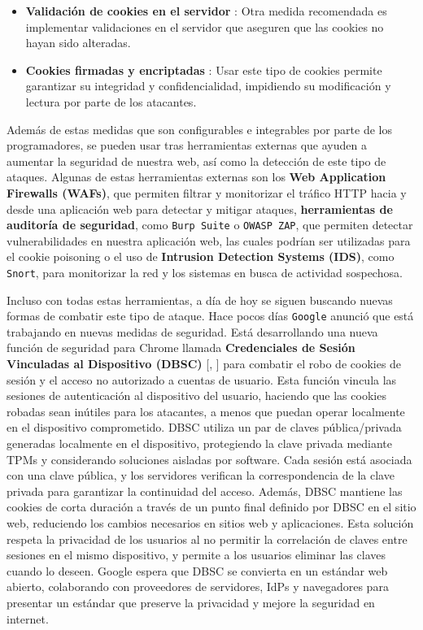 \begin{itemize}
    \item \textbf{Validación de cookies en el servidor} : Otra medida recomendada es implementar validaciones en el servidor que aseguren que las cookies no hayan sido alteradas.

    \item \textbf{Cookies firmadas y encriptadas} : Usar este tipo de cookies permite garantizar su integridad y confidencialidad, impidiendo su modificación y lectura por parte de los atacantes.
\end{itemize}

Además de estas medidas que son configurables e integrables por parte de los programadores, se pueden usar tras herramientas externas que ayuden a aumentar la seguridad de nuestra web, así como la detección de este tipo de ataques. Algunas de estas herramientas externas son los \textbf{Web Application Firewalls (WAFs)}, que permiten filtrar y monitorizar el tráfico HTTP hacia y desde una aplicación web para detectar y mitigar ataques, \textbf{herramientas de auditoría de seguridad}, como \texttt{Burp Suite} o \texttt{OWASP ZAP}, que permiten detectar vulnerabilidades en nuestra aplicación web, las cuales podrían ser utilizadas para el cookie poisoning o el uso de \textbf{Intrusion Detection Systems (IDS)}, como \texttt{Snort}, para monitorizar la red y los sistemas en busca de actividad sospechosa.

Incluso con todas estas herramientas, a día de hoy se siguen buscando nuevas formas de combatir este tipo de ataque. Hace pocos días \texttt{Google} anunció que está trabajando en nuevas medidas de seguridad. Está desarrollando una nueva función de seguridad para Chrome llamada \textbf{Credenciales de Sesión Vinculadas al Dispositivo (DBSC)} [\cite{bitlifemedia2024google}, \cite{escudodigital2024google}] para combatir el robo de cookies de sesión y el acceso no autorizado a cuentas de usuario. Esta función vincula las sesiones de autenticación al dispositivo del usuario, haciendo que las cookies robadas sean inútiles para los atacantes, a menos que puedan operar localmente en el dispositivo comprometido. DBSC utiliza un par de claves pública/privada generadas localmente en el dispositivo, protegiendo la clave privada mediante TPMs y considerando soluciones aisladas por software. Cada sesión está asociada con una clave pública, y los servidores verifican la correspondencia de la clave privada para garantizar la continuidad del acceso. Además, DBSC mantiene las cookies de corta duración a través de un punto final definido por DBSC en el sitio web, reduciendo los cambios necesarios en sitios web y aplicaciones. Esta solución respeta la privacidad de los usuarios al no permitir la correlación de claves entre sesiones en el mismo dispositivo, y permite a los usuarios eliminar las claves cuando lo deseen. Google espera que DBSC se convierta en un estándar web abierto, colaborando con proveedores de servidores, IdPs y navegadores para presentar un estándar que preserve la privacidad y mejore la seguridad en internet.

